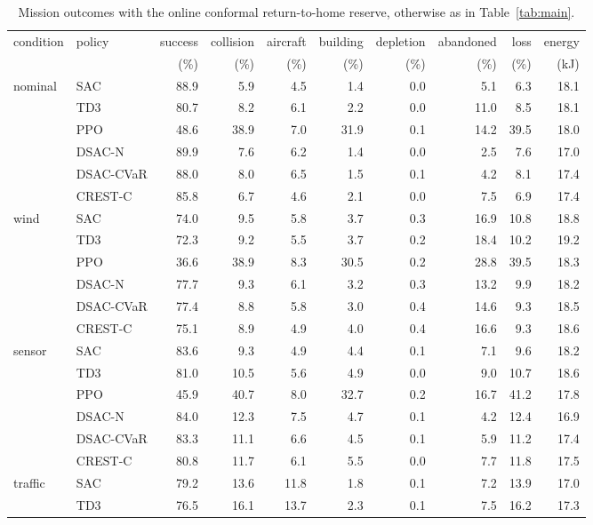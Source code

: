 \begin{table}[tb]
\centering
\caption{Mission outcomes with the online conformal return-to-home reserve, otherwise as in Table~\ref{tab:main}.}
\label{tab:online}
\small
\begin{tabular}{llrrrrrrrr}
\toprule
condition & policy & success & collision & aircraft & building & depletion & abandoned & loss & energy \\
 &  & (\%) & (\%) & (\%) & (\%) & (\%) & (\%) & (\%) & (kJ) \\
\midrule
nominal & SAC & 88.9 & 5.9 & 4.5 & 1.4 & 0.0 & 5.1 & 6.3 & 18.1 \\
 & TD3 & 80.7 & 8.2 & 6.1 & 2.2 & 0.0 & 11.0 & 8.5 & 18.1 \\
 & PPO & 48.6 & 38.9 & 7.0 & 31.9 & 0.1 & 14.2 & 39.5 & 18.0 \\
 & DSAC-N & 89.9 & 7.6 & 6.2 & 1.4 & 0.0 & 2.5 & 7.6 & 17.0 \\
 & DSAC-CVaR & 88.0 & 8.0 & 6.5 & 1.5 & 0.1 & 4.2 & 8.1 & 17.4 \\
 & CREST-C & 85.8 & 6.7 & 4.6 & 2.1 & 0.0 & 7.5 & 6.9 & 17.4 \\
\addlinespace[2pt]
wind & SAC & 74.0 & 9.5 & 5.8 & 3.7 & 0.3 & 16.9 & 10.8 & 18.8 \\
 & TD3 & 72.3 & 9.2 & 5.5 & 3.7 & 0.2 & 18.4 & 10.2 & 19.2 \\
 & PPO & 36.6 & 38.9 & 8.3 & 30.5 & 0.2 & 28.8 & 39.5 & 18.3 \\
 & DSAC-N & 77.7 & 9.3 & 6.1 & 3.2 & 0.3 & 13.2 & 9.9 & 18.2 \\
 & DSAC-CVaR & 77.4 & 8.8 & 5.8 & 3.0 & 0.4 & 14.6 & 9.3 & 18.5 \\
 & CREST-C & 75.1 & 8.9 & 4.9 & 4.0 & 0.4 & 16.6 & 9.3 & 18.6 \\
\addlinespace[2pt]
sensor & SAC & 83.6 & 9.3 & 4.9 & 4.4 & 0.1 & 7.1 & 9.6 & 18.2 \\
 & TD3 & 81.0 & 10.5 & 5.6 & 4.9 & 0.0 & 9.0 & 10.7 & 18.6 \\
 & PPO & 45.9 & 40.7 & 8.0 & 32.7 & 0.2 & 16.7 & 41.2 & 17.8 \\
 & DSAC-N & 84.0 & 12.3 & 7.5 & 4.7 & 0.1 & 4.2 & 12.4 & 16.9 \\
 & DSAC-CVaR & 83.3 & 11.1 & 6.6 & 4.5 & 0.1 & 5.9 & 11.2 & 17.4 \\
 & CREST-C & 80.8 & 11.7 & 6.1 & 5.5 & 0.0 & 7.7 & 11.8 & 17.5 \\
\addlinespace[2pt]
traffic & SAC & 79.2 & 13.6 & 11.8 & 1.8 & 0.1 & 7.2 & 13.9 & 17.0 \\
 & TD3 & 76.5 & 16.1 & 13.7 & 2.3 & 0.1 & 7.5 & 16.2 & 17.3 \\

\end{tabular}
\end{table}
